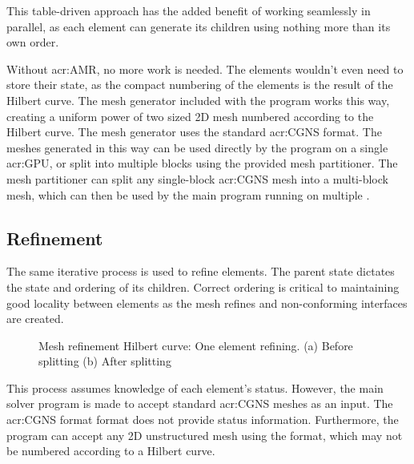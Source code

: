 This table-driven approach has the added benefit of working seamlessly in parallel, as each element
can generate its children using nothing more than its own order.

Without \acrlong{acr:AMR}, no more work is needed. The elements wouldn't even need to store their
state, as the compact numbering of the elements is the result of the Hilbert curve. The mesh
generator included with the program works this way, creating a uniform power of two sized 2D mesh
numbered according to the Hilbert curve. The mesh generator uses the standard \acrshort{acr:CGNS}
format. The meshes generated in this way can be used directly by the program on a single
\acrshort{acr:GPU}, or split into multiple blocks using the provided mesh partitioner. The mesh
partitioner can split any single-block \acrshort{acr:CGNS} mesh into a multi-block mesh, which can
then be used by the main program running on multiple .

\subsection{Refinement}\label{section:load_balancing:hilbert_curve:refinement}

The same iterative process is used to refine elements. The parent state dictates the state and
ordering of its children. Correct ordering is critical to maintaining good locality between elements
as the mesh refines and non-conforming interfaces are created.

\begin{figure}[H]
	\centering
	\hfill
	\caption{Mesh refinement Hilbert curve: One element refining. (a) Before splitting (b) After splitting}\label{fig:hilbert_refining}
\end{figure}

This process assumes knowledge of each element's status. However, the main solver program is made to
accept standard \acrshort{acr:CGNS} meshes as an input. The \acrshort{acr:CGNS} format format does
not provide status information. Furthermore, the program can accept any 2D unstructured mesh using
the format, which may not be numbered according to a Hilbert curve. 

